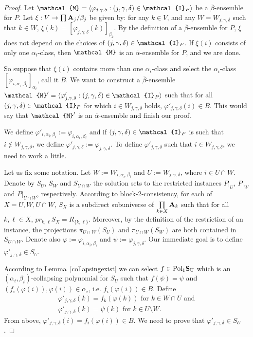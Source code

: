 \documentclass[11pt]{amsart}
\newcommand{\m}[1]{{\uppercase {\mathbf {#1}}}}
\newcommand{\vr}[1]{{\uppercase {\mathcal{#1}}}}
\newcommand{\poln}[2]{{\rm Pol_{#1}\m #2}}
\newcommand{\lb}{\langle}
\newcommand{\rb}{\rangle}
\theoremstyle{definition}
\begin{document}
\begin{proof}
Let $\vr m=\lb \varphi_{j,\gamma,\delta}:(j,\gamma,\delta)\in \vr i_P\rb$ be a $\overline{\beta}$-ensemble for $P$. Let $\xi:V\rightarrow \prod \m a_j/\beta_j$ be given by: for any $k\in V$, and any $W=W_{j,\gamma,\delta}$ such that $k\in W$, $\xi(k)=[\varphi_{j,\gamma,\delta}(k)]_{\beta_k}$. By the definition of a $\overline{\beta}$-ensemble for $P$, $\xi$ does not depend on the choices of $(j,\gamma,\delta)\in\vr i_P$. If $\xi(i)$ consists of only one $\alpha_i$-class, then $\vr m$ is an $\overline{\alpha}$-ensemble for $P$, and we are done.

So suppose that $\xi(i)$ contains more than one $\alpha_i$-class and select the $\alpha_i$-class $[\varphi_{i,\alpha_i,\beta_i}]_{\alpha_i}$, call it $B$. We want to construct a $\overline{\beta}$-ensemble $\vr m'=\lb \varphi'_{j,\gamma,\delta}:(j,\gamma,\delta)\in \vr i_P\rb$ such that for all $(j,\gamma,\delta)\in \vr i_P$ for which $i\in W_{j,\gamma,\delta}$ holds, $\varphi'_{j,\gamma,\delta}(i)\in B$. This would say that $\vr m'$ is an $\overline{\alpha}$-ensemble and finish our proof. 

We define $\varphi'_{i,\alpha_i,\beta_i}:=\varphi_{i,\alpha_i,\beta_i}$ and if $(j,\gamma,\delta)\in \vr i_P$ is such that $i\notin W_{j,\gamma,\delta}$, we define $\varphi'_{j,\gamma,\delta}:=\varphi_{j,\gamma,\delta}$. To define $\varphi'_{j,\gamma,\delta}$ such that $i\in W_{j,\gamma,\delta}$, we need to work a little. 

Let us fix some notation. Let $W:=W_{i,\alpha_i,\beta_i}$ and $U:=W_{j,\gamma,\delta}$, where $i\in U\cap W$. Denote by $S_U$, $S_W$ and $S_{U\cap W}$ the solution sets to the restricted instances $P|_U$, $P|_W$ and $P|_{U\cap W}$, respectively. According to block-2-consistency, for each of $X=U,W,U\cap W$, $S_X$ is a subdirect subuniverse of $\prod\limits_{k\in X}\m a_k$ such that for all $k,\ell\in X$, $pr_{k,\ell}S_X=R_{\{k,\ell\}}$. Moreover, by the definition of the restriction of an instance, the projections $\pi_{U\cap W}(S_U)$ and $\pi_{U\cap W}(S_W)$ are both contained in $S_{U\cap W}$. Denote also $\varphi:=\varphi_{i,\alpha_i,\beta_i}$ and $\psi:=\varphi_{j,\gamma,\delta}$. Our immediate goal is to define $\varphi'_{j,\gamma,\delta}\in S_U$.

According to Lemma~\ref{collapsingexist} we can select $f\in\poln{1}{S_U}$ which is an $(\alpha_i,\beta_i)$-collapsing polynomial for $S_U$ such that $f(\psi)=\psi$ and $(f_i(\varphi(i)),\varphi(i))\in\alpha_i$, i.e. $f_i(\varphi(i))\in B$. Define 
$$
\begin{gathered}
\varphi'_{j,\gamma,\delta}(k)=f_k(\varphi(k))\text{ for }k\in W\cap U\text{ and}\\
\varphi'_{j,\gamma,\delta}(k)=\psi(k)\text{ for }k\in U\setminus W.
\end{gathered}
$$
From above, $\varphi'_{j,\gamma,\delta}(i)=f_i(\varphi(i))\in B$. We need to prove that $\varphi'_{j,\gamma,\delta}\in S_U$.


\end{proof}
\end{document}

